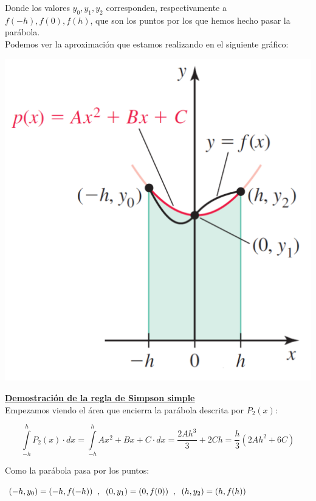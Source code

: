 \documentclass{article}
\begin{document}
			Donde los valores $y_0, y_1, y_2$ corresponden, respectivamente a $f(-h), f(0), f(h)$, que son los puntos por los que hemos hecho pasar la parábola.\\
			
			Podemos ver la aproximación que estamos realizando en el siguiente gráfico:
			
			\begin{center}
				\includegraphics[scale=0.55]{simple}
			\end{center}
			
			\underline{\textbf{Demostración de la regla de Simpson simple}} \\
			
			Empezamos viendo el área que encierra la parábola descrita por $P_2(x)$:
			
			\begin{equation}\label{eq:simsim}
				\int \limits_{-h}^{h} P_2(x) \cdot dx = 
				\int \limits_{-h}^{h} Ax^2+Bx+C \cdot dx =
				\frac{2Ah^3}{3}+2Ch = \frac{h}{3}(2Ah^2+6C)
			\end{equation}
			
			Como la parábola pasa por los puntos:
			
			\begin{center}
				$(-h,y_0)=(-h,f(-h)) \hspace{2mm},\hspace{2mm}
				(0,y_1)=(0,f(0)) \hspace{2mm},\hspace{2mm}
				(h,y_2)=(h,f(h))$
			\end{center}
			
\end{document}
